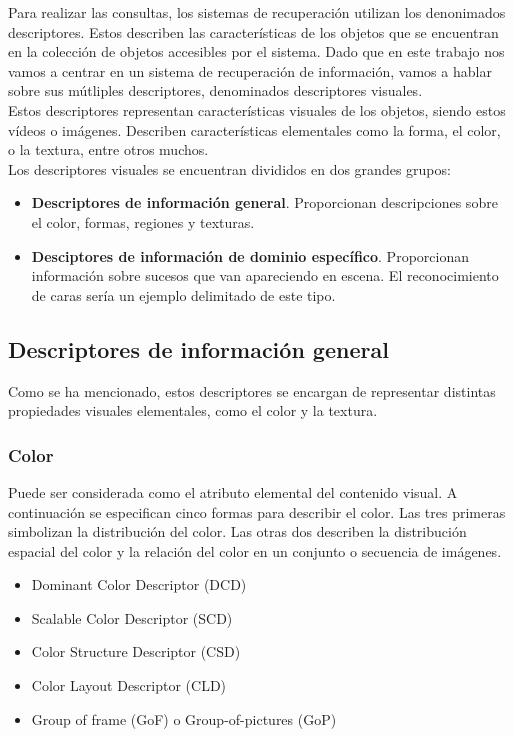 Para realizar las consultas, los sistemas de recuperación utilizan los denonimados descriptores. Estos describen las características de los objetos que se encuentran en la colección de objetos accesibles por el sistema. Dado que en este trabajo nos vamos a centrar en un sistema de recuperación de información, vamos a hablar sobre sus mútliples descriptores, denominados descriptores visuales.\\

Estos descriptores representan características visuales de los objetos, siendo estos vídeos o imágenes. Describen características elementales como la forma, el color, o la textura, entre otros muchos.\\

Los descriptores visuales se encuentran divididos en dos grandes grupos:

\begin{itemize}

\item \textbf{Descriptores de información general}. Proporcionan descripciones sobre el color, formas, regiones y texturas.

\item \textbf{Desciptores de información de dominio específico}. Proporcionan información sobre sucesos que van apareciendo en escena. El reconocimiento de caras sería un ejemplo delimitado de este tipo.

\end{itemize}

\subsection{Descriptores de información general}

Como se ha mencionado, estos descriptores se encargan de representar distintas propiedades visuales elementales, como el color y la textura.

\subsubsection{Color}

Puede ser considerada como el atributo elemental del contenido visual. A continuación se especifican cinco formas para describir el color. Las tres primeras simbolizan la distribución del color. Las otras dos describen la distribución espacial del color y la relación del color en un conjunto o secuencia de imágenes.

\begin{itemize}
\item Dominant Color Descriptor (DCD)
\item Scalable Color Descriptor (SCD)
\item Color Structure Descriptor (CSD)
\item Color Layout Descriptor (CLD)
\item Group of frame (GoF) o Group-of-pictures (GoP)
\end{itemize}

